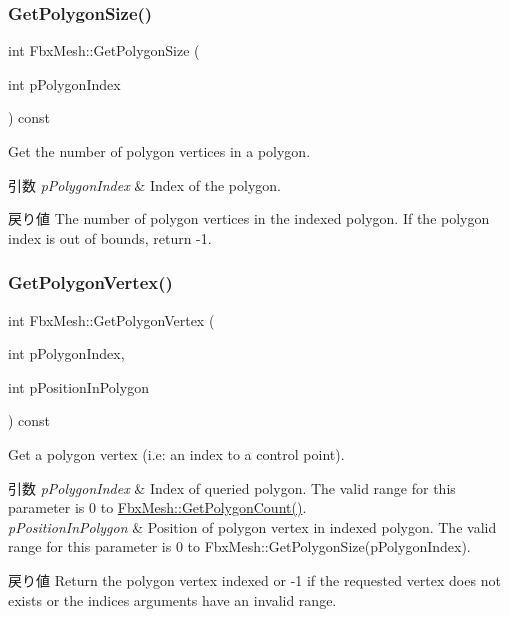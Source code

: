 \subsubsection{\texorpdfstring{Get\+Polygon\+Size()}{GetPolygonSize()}}
{\footnotesize\ttfamily int Fbx\+Mesh\+::\+Get\+Polygon\+Size (\begin{DoxyParamCaption}\item[{int}]{p\+Polygon\+Index }\end{DoxyParamCaption}) const}

Get the number of polygon vertices in a polygon. 
\begin{DoxyParams}{引数}
{\em p\+Polygon\+Index} & Index of the polygon. \\
\hline
\end{DoxyParams}
\begin{DoxyReturn}{戻り値}
The number of polygon vertices in the indexed polygon. If the polygon index is out of bounds, return -\/1. 
\end{DoxyReturn}
\mbox{\label{class_fbx_mesh_ad1875b3c43e44bf960e371cd668734b3}} 
\subsubsection{\texorpdfstring{Get\+Polygon\+Vertex()}{GetPolygonVertex()}}
{\footnotesize\ttfamily int Fbx\+Mesh\+::\+Get\+Polygon\+Vertex (\begin{DoxyParamCaption}\item[{int}]{p\+Polygon\+Index,  }\item[{int}]{p\+Position\+In\+Polygon }\end{DoxyParamCaption}) const}

Get a polygon vertex (i.\+e\+: an index to a control point). 
\begin{DoxyParams}{引数}
{\em p\+Polygon\+Index} & Index of queried polygon. The valid range for this parameter is 0 to {\ttfamily \hyperlink{class_fbx_mesh_a0f443f6d64284e6b60bdd52fb1f53ea7}{Fbx\+Mesh\+::\+Get\+Polygon\+Count()}}. \\
\hline
{\em p\+Position\+In\+Polygon} & Position of polygon vertex in indexed polygon. The valid range for this parameter is 0 to {\ttfamily Fbx\+Mesh\+::\+Get\+Polygon\+Size(p\+Polygon\+Index)}. \\
\hline
\end{DoxyParams}
\begin{DoxyReturn}{戻り値}
Return the polygon vertex indexed or -\/1 if the requested vertex does not exists or the indices arguments have an invalid range. 
\end{DoxyReturn}
\mbox{\label{class_fbx_mesh_a46cdb95dfe5052564aeeba288474076e}} 
